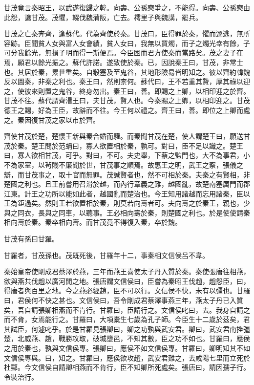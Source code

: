 甘茂竟言秦昭王，以武遂復歸之韓。向壽、公孫奭爭之，不能得。向壽、公孫奭由此怨，讒甘茂。茂懼，輟伐魏蒲阪，亡去。樗里子與魏講，罷兵。

甘茂之亡秦奔齊，逢蘇代。代為齊使於秦。甘茂曰，臣得罪於秦，懼而遯逃，無所容跡。臣聞貧人女與富人女會績，貧人女曰，我無以買燭，而子之燭光幸有餘，子可分我餘光，無損子明而得一斯便焉。今臣困而君方使秦而當路矣。茂之妻子在焉，願君以餘光振之。蘇代許諾。遂致使於秦。已，因說秦王曰，甘茂，非常士也。其居於秦，累世重矣。自殽塞及至鬼谷，其地形險易皆明知之。彼以齊約韓魏反以圖秦，非秦之利也。秦王曰，然則柰何。蘇代曰，王不若重其贄，厚其祿以迎之，使彼來則置之鬼谷，終身勿出。秦王曰，善。即賜之上卿，以相印迎之於齊。甘茂不往。蘇代謂齊湣王曰，夫甘茂，賢人也。今秦賜之上卿，以相印迎之。甘茂德王之賜，好為王臣，故辭而不往。今王何以禮之。齊王曰，善。即位之上卿而處之。秦因復甘茂之家以市於齊。

齊使甘茂於楚，楚懷王新與秦合婚而驩。而秦聞甘茂在楚，使人謂楚王曰，願送甘茂於秦。楚王問於范蜎曰，寡人欲置相於秦，孰可。對曰，臣不足以識之。楚王曰，寡人欲相甘茂，可乎。對曰，不可。夫史舉，下蔡之監門也，大不為事君，小不為家室，以茍賤不廉聞於世，甘茂事之順焉。故惠王之明，武王之察，張儀之辯，而甘茂事之，取十官而無罪。茂誠賢者也，然不可相於秦。夫秦之有賢相，非楚國之利也。且王前嘗用召滑於越，而內行章義之難，越國亂，故楚南塞厲門而郡江東。計王之功所以能如此者，越國亂而楚治也。今王知用諸越而忘用諸秦，臣以王為鉅過矣。然則王若欲置相於秦，則莫若向壽者可。夫向壽之於秦王，親也，少與之同衣，長與之同車，以聽事。王必相向壽於秦，則楚國之利也。於是使使請秦相向壽於秦。秦卒相向壽。而甘茂竟不得復入秦，卒於魏。

甘茂有孫曰甘羅。

甘羅者，甘茂孫也。茂既死後，甘羅年十二，事秦相文信侯呂不韋。

秦始皇帝使剛成君蔡澤於燕，三年而燕王喜使太子丹入質於秦。秦使張唐往相燕，欲與燕共伐趙以廣河閒之地。張唐謂文信侯曰，臣嘗為秦昭王伐趙，趙怨臣，曰，得唐者與百里之地。今之燕必經趙，臣不可以行。文信侯不快，未有以彊也。甘羅曰，君侯何不快之甚也。文信侯曰，吾令剛成君蔡澤事燕三年，燕太子丹已入質矣，吾自請張卿相燕而不肯行。甘羅曰，臣請行之。文信侯叱曰，去。我身自請之而不肯，女焉能行之。甘羅曰，大項橐生七歲為孔子師。今臣生十二歲於茲矣，君其試臣，何遽叱乎。於是甘羅見張卿曰，卿之功孰與武安君。卿曰，武安君南挫彊楚，北威燕、趙，戰勝攻取，破城墮邑，不知其數，臣之功不如也。甘羅曰，應侯之用於秦也，孰與文信侯專。張卿曰，應侯不如文信侯專。甘羅曰，卿明知其不如文信侯專與。曰，知之。甘羅曰，應侯欲攻趙，武安君難之，去咸陽七里而立死於杜郵。今文信侯自請卿相燕而不肯行，臣不知卿所死處矣。張唐曰，請因孺子行。令裝治行。

